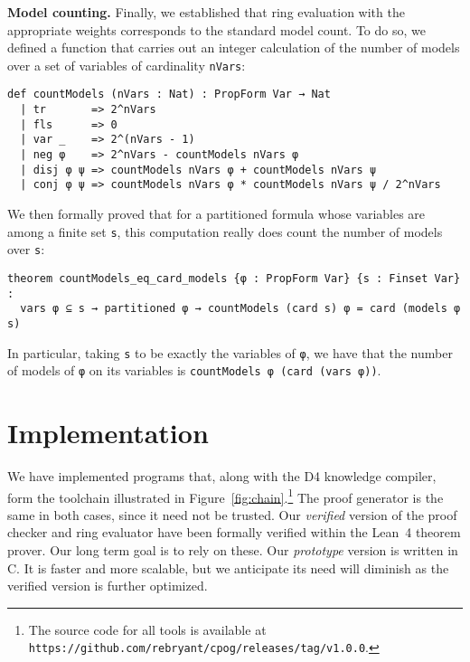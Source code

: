 \documentclass[twoside,11pt]{article}
\newcommand{\url}[1]{\texttt{#1}}
\newcommand{\progname}[1]{\textsc{#1}}
\newcommand{\dfour}{\progname{D4}}
\newcommand{\lean}{Lean~4}
\begin{document}
\vspace{1em}\noindent
\textbf{Model counting.} Finally, we established that ring evaluation with the appropriate weights
corresponds to the standard model count. To do so, we defined a function that
carries out an integer calculation of the number of models over a set of variables
of cardinality \lstinline{nVars}:
\begin{lstlisting}
def countModels (nVars : Nat) : PropForm Var → Nat
  | tr       => 2^nVars
  | fls      => 0
  | var _    => 2^(nVars - 1)
  | neg φ    => 2^nVars - countModels nVars φ
  | disj φ ψ => countModels nVars φ + countModels nVars ψ
  | conj φ ψ => countModels nVars φ * countModels nVars ψ / 2^nVars
\end{lstlisting}
We then formally proved that for a partitioned formula whose variables are among a finite set
\lstinline{s}, this computation really does count the number of models over \lstinline{s}:
\begin{lstlisting}
theorem countModels_eq_card_models {φ : PropForm Var} {s : Finset Var} :
  vars φ ⊆ s → partitioned φ → countModels (card s) φ = card (models φ s)
\end{lstlisting}
In particular, taking \lstinline{s} to be exactly the variables of \lstinline{φ},
we have that the number of models of \lstinline{φ} on its variables is
\lstinline{countModels φ (card (vars φ))}.


\section{Implementation}
We have implemented programs that, along with
the \dfour{} knowledge compiler, form the toolchain illustrated in
Figure~\ref{fig:chain}.\footnote{The source code for all tools
is available at \url{https://github.com/rebryant/cpog/releases/tag/v1.0.0}.}  The proof generator is the same in both
cases, since it need not be trusted.
Our \emph{verified}
version of the proof checker and ring evaluator have been formally
verified within the \lean{} theorem prover.  Our long term goal is to
rely on these.  Our \emph{prototype} version is written in C\@.
It is faster and
more scalable, but we anticipate its need will diminish as the
verified version is further optimized.
\end{document}
